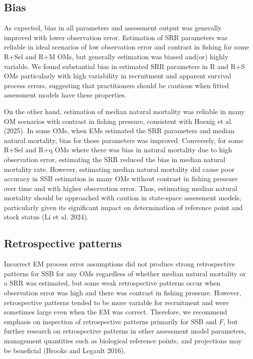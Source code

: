 \documentclass[
  12pt,
]{article}
\begin{document}
\subsection*{Bias}\label{bias-2}

As expected, bias in all parameters and assessment output was generally
improved with lower observation error. Estimation of SRR parameters was
reliable in ideal scenarios of low observation error and contrast in
fishing for some R+Sel and R+M OMs, but generally estimation was biased
and(or) highly variable. We found substantial bias in estimated SRR
parameters in R and R+S OMs particularly with high variability in
recruitment and apparent survival process errors, suggesting that
practitioners should be cautious when fitted assessment models have
these properties.

On the other hand, estimation of median natural mortality was reliable
in many OM scenarios with contrast in fishing pressure, consistent with
Hoenig et al. (2025). In some OMs, when EMs estimated the SRR parameters
and median natural mortality, bias for those parameters was improved.
Conversely, for some R+Sel and R+q OMs where there was bias in natural
mortality due to high observation error, estimating the SRR reduced the
bias in median natural mortality rate. However, estimating median
natural mortality did cause poor accuracy in SSB estimation in many OMs
without contrast in fishing pressure over time and with higher
observation error. Thus, estimating median natural mortality should be
approached with caution in state-space assessment models, particularly
given its significant impact on determination of reference point and
stock status (Li et al. 2024).

\subsection*{Retrospective patterns}\label{retrospective-patterns}

Incorrect EM process error assumptions did not produce strong
retrospective patterns for SSB for any OMs regardless of whether median
natural mortality or a SRR was estimated, but some weak retrospective
patterns occur when observation error was high and there was contrast in
fishing pressure. However, retrospective patterns tended to be more
variable for recruitment and were sometimes large even when the EM was
correct. Therefore, we recommend emphasis on inspection of retrospective
patterns primarily for SSB and \(F\), but further research on
retrospective patterns in other assessment model parameters, management
quantities such as biological reference points, and projections may be
beneficial (Brooks and Legault 2016).
\end{document}
